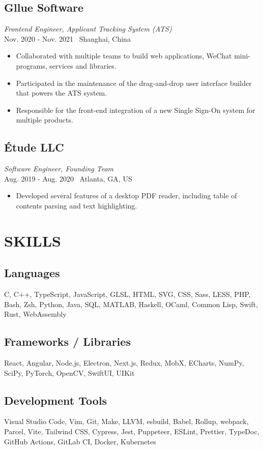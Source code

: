 \documentclass[11pt,twocolumn]{article}
\begin{document}
\subsection*{Gllue Software}
\textit{Frontend Engineer, Applicant Tracking System (ATS)}\\
Nov. 2020 - Nov. 2021 \textbullet\ Shanghai, China

\begin{itemize}
\item Collaborated with multiple teams to build web applications, WeChat mini-programs, services and libraries.
\item Participated in the maintenance of the drag-and-drop user interface builder that powers the ATS system.
\item Responsible for the front-end integration of a new Single Sign-On system for multiple products.
\end{itemize}

\subsection*{Étude LLC}
\textit{Software Engineer, Founding Team}\\
Aug. 2019 - Aug. 2020 \textbullet\ Atlanta, GA, US

\begin{itemize}
\item Developed several features of a desktop PDF reader, including table of contents parsing and text highlighting.
\end{itemize}

\section*{\textnormal{SKILLS}}
\subsection*{Languages}
C, C++, TypeScript, JavaScript, GLSL, HTML, SVG, CSS, Sass, LESS, PHP, Bash, Zsh, Python, Java, SQL, MATLAB, Haskell, OCaml, Common Lisp, Swift, Rust, WebAssembly

\subsection*{Frameworks / Libraries}
React, Angular, Node.js, Electron, Next.js, Redux, MobX, ECharts, NumPy, SciPy, PyTorch, OpenCV, SwiftUI, UIKit

\subsection*{Development Tools}
Visual Studio Code, Vim, Git, Make, LLVM, esbuild, Babel, Rollup, webpack, Parcel, Vite, Tailwind CSS, Cypress, Jest, Puppeteer, ESLint, Prettier, TypeDoc, GitHub Actions, GitLab CI, Docker, Kubernetes
\end{document}
